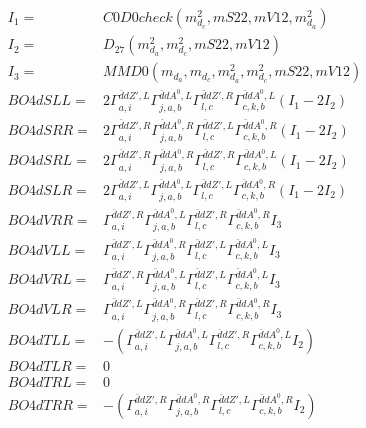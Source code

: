 \documentclass[A4,landscape]{article}
\begin{document}
\begin{align} 
I_1 = & C0D0check(m^2_{d_{{c}}}, mS22, mV12, m^2_{d_{{a}}}) \\ 
I_2 = & D_{27}(m^2_{d_{{a}}}, m^2_{d_{{c}}}, mS22, mV12) \\ 
I_3 = & MMD0(m_{d_{{a}}}, m_{d_{{c}}}, m^2_{d_{{a}}}, m^2_{d_{{c}}}, mS22, mV12) \\ 
  BO4dSLL= & 2  \Gamma^{\bar{d}d {Z'} ,L}_{a, i} \Gamma^{\bar{d}d A^0 ,L}_{j, a, b} \Gamma^{\bar{d}d {Z'} ,R}_{l, c} \Gamma^{\bar{d}d A^0 ,L}_{c, k, b} (I_1 - 2 I_2) \\ 
  BO4dSRR= & 2  \Gamma^{\bar{d}d {Z'} ,R}_{a, i} \Gamma^{\bar{d}d A^0 ,R}_{j, a, b} \Gamma^{\bar{d}d {Z'} ,L}_{l, c} \Gamma^{\bar{d}d A^0 ,R}_{c, k, b} (I_1 - 2 I_2) \\ 
  BO4dSRL= & 2  \Gamma^{\bar{d}d {Z'} ,R}_{a, i} \Gamma^{\bar{d}d A^0 ,R}_{j, a, b} \Gamma^{\bar{d}d {Z'} ,R}_{l, c} \Gamma^{\bar{d}d A^0 ,L}_{c, k, b} (I_1 - 2 I_2) \\ 
  BO4dSLR= & 2  \Gamma^{\bar{d}d {Z'} ,L}_{a, i} \Gamma^{\bar{d}d A^0 ,L}_{j, a, b} \Gamma^{\bar{d}d {Z'} ,L}_{l, c} \Gamma^{\bar{d}d A^0 ,R}_{c, k, b} (I_1 - 2 I_2) \\ 
  BO4dVRR= &  \Gamma^{\bar{d}d {Z'} ,R}_{a, i} \Gamma^{\bar{d}d A^0 ,L}_{j, a, b} \Gamma^{\bar{d}d {Z'} ,R}_{l, c} \Gamma^{\bar{d}d A^0 ,R}_{c, k, b} I_3 \\ 
  BO4dVLL= &  \Gamma^{\bar{d}d {Z'} ,L}_{a, i} \Gamma^{\bar{d}d A^0 ,R}_{j, a, b} \Gamma^{\bar{d}d {Z'} ,L}_{l, c} \Gamma^{\bar{d}d A^0 ,L}_{c, k, b} I_3 \\ 
  BO4dVRL= &  \Gamma^{\bar{d}d {Z'} ,R}_{a, i} \Gamma^{\bar{d}d A^0 ,L}_{j, a, b} \Gamma^{\bar{d}d {Z'} ,L}_{l, c} \Gamma^{\bar{d}d A^0 ,L}_{c, k, b} I_3 \\ 
  BO4dVLR= &  \Gamma^{\bar{d}d {Z'} ,L}_{a, i} \Gamma^{\bar{d}d A^0 ,R}_{j, a, b} \Gamma^{\bar{d}d {Z'} ,R}_{l, c} \Gamma^{\bar{d}d A^0 ,R}_{c, k, b} I_3 \\ 
  BO4dTLL= & -( \Gamma^{\bar{d}d {Z'} ,L}_{a, i} \Gamma^{\bar{d}d A^0 ,L}_{j, a, b} \Gamma^{\bar{d}d {Z'} ,R}_{l, c} \Gamma^{\bar{d}d A^0 ,L}_{c, k, b} I_2) \\ 
  BO4dTLR= & 0 \\ 
  BO4dTRL= & 0 \\ 
  BO4dTRR= & -( \Gamma^{\bar{d}d {Z'} ,R}_{a, i} \Gamma^{\bar{d}d A^0 ,R}_{j, a, b} \Gamma^{\bar{d}d {Z'} ,L}_{l, c} \Gamma^{\bar{d}d A^0 ,R}_{c, k, b} I_2) \\ 
\end{align} 
\end{document}
